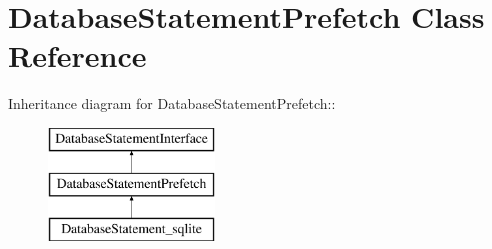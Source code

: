 \hypertarget{classDatabaseStatementPrefetch}{
\section{DatabaseStatementPrefetch Class Reference}
\label{classDatabaseStatementPrefetch}
}
Inheritance diagram for DatabaseStatementPrefetch::\begin{figure}[H]
\begin{center}
\leavevmode
\includegraphics[height=3cm]{classDatabaseStatementPrefetch}
\end{center}
\end{figure}

